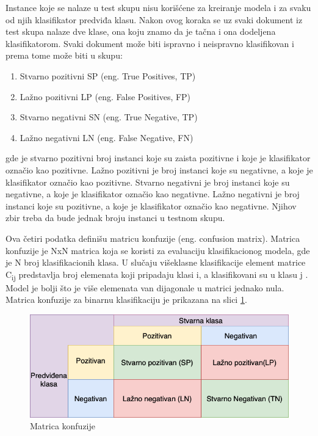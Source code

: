 \documentclass[12pt,oneside]{memoir}
\begin{document}
Instance koje se nalaze u test skupu nisu korišćene za kreiranje modela i za svaku od njih klasifikator predviđa klasu. Nakon ovog koraka se uz svaki dokument iz test skupa nalaze dve klase, ona koju znamo da je tačna i ona dodeljena klasifikatorom. Svaki dokument može biti ispravno i neispravno klasifikovan i prema tome može biti u skupu:

\begin{enumerate}
\item Stvarno pozitivni SP (eng. True Positives, TP)
\item Lažno pozitivni LP (eng. False Positives, FP)
\item Stvarno negativni SN (eng. True Negative, TP)
\item Lažno negativni LN (eng. False Negative, FN)
\end{enumerate}
\noindent
gde je stvarno pozitivni broj instanci koje su zaista pozitivne i koje je klasifikator označio kao pozitivne. Lažno pozitivni je broj instanci koje su negativne, a koje je klasifikator označio kao pozitivne. Stvarno negativni je broj instanci koje su negativne, a koje je klasifikator označio kao negativne. Lažno negativni je broj instanci koje su pozitivne, a koje je klasifikator označio kao negativne. Njihov zbir treba da bude jednak broju instanci u testnom skupu.

Ova četiri podatka definišu matricu konfuzije (eng. confusion matrix). Matrica konfuzije je NxN matrica koja se koristi za evaluaciju klasifikacionog modela, gde je N broj klasifikacionih klasa. U slučaju višeklasne klasifikacije element matrice C\textsubscript{ij} predstavlja broj elemenata koji pripadaju klasi i, a klasifikovani su u klasu j \cite{MarijaMR}. Model je bolji što je više elemenata van dijagonale u matrici jednako nula. Matrica konfuzije za binarnu klasifikaciju je prikazana na slici \ref{img:confusionMatrix}.

\begin{figure}[h!]
\centering
\includegraphics[width=.7\textwidth]{images/confusionMatrix.png}
\caption{Matrica konfuzije}
\label{img:confusionMatrix}
\end{figure}
\end{document}
